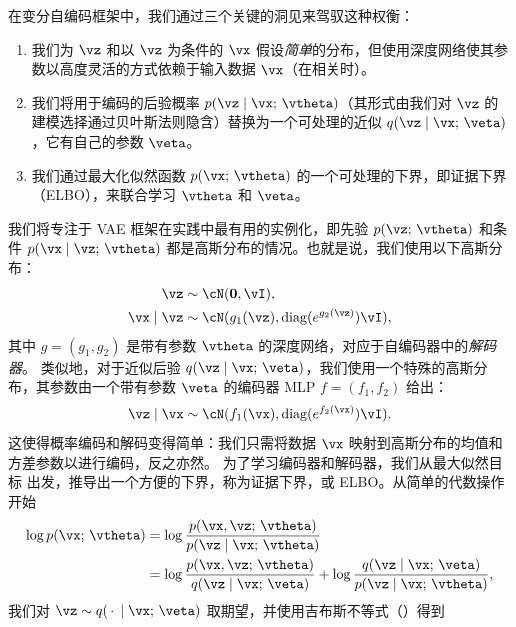 \documentclass[../../book-main.tex]{subfiles}
\begin{document}
在变分自编码框架中，我们通过三个关键的洞见来驾驭这种权衡：
\begin{enumerate}
\item 我们为 $\vz$ 和以 $\vz$ 为条件的 $\vx$ 假设\textit{简单}的分布，但使用深度网络使其参数以高度灵活的方式依赖于输入数据 $\vx$（在相关时）。
\item 我们将用于编码的后验概率 $p(\vz \mid \vx;\, \vtheta)$（其形式由我们对 $\vz$ 的建模选择通过贝叶斯法则隐含）替换为一个可处理的近似 $q(\vz \mid \vx;\, \veta)$，它有自己的参数 $\veta$。
\item 我们通过最大化似然函数 $p(\vx ;\, \vtheta)$ 的一个可处理的下界，即证据下界（ELBO），来联合学习 $\vtheta$ 和 $\veta$。
\end{enumerate}
我们将专注于 VAE 框架在实践中最有用的实例化，即先验 $p(\vz ;\, \vtheta)$ 和条件 $p(\vx \mid \vz;\,
\vtheta)$ 都是高斯分布的情况。也就是说，我们使用以下高斯分布：
\begin{align*}
\vz &\sim \cN(\Zero, \vI), \\
\vx \mid \vz &\sim \cN(g_1(\vz), \diag(e^{g_2(\vz)}) \vI),
\end{align*}
其中 $g = (g_1, g_2)$ 是带有参数 $\vtheta$ 的深度网络，对应于自编码器中的\textit{解码器}。
类似地，对于近似后验 $q(\vz \mid \vx;\, \veta)$，我们使用一个特殊的高斯分布，其参数由一个带有参数 $\veta$ 的编码器 MLP $f = (f_1, f_2)$ 给出：
\begin{equation*}
\vz \mid \vx \sim \cN(f_1(\vx), \diag(e^{f_2(\vx)}) \vI).
\end{equation*}
这使得概率编码和解码变得简单：我们只需将数据 $\vx$ 映射到高斯分布的均值和方差参数以进行编码，反之亦然。
为了学习编码器和解码器，我们从最大似然目标  出发，推导出一个方便的下界，称为证据下界，或 ELBO。从简单的代数操作开始
\begin{align*}
\log p(\vx;\, \vtheta) &=
\log \frac{p(\vx, \vz;\, \vtheta)}{p(\vz \mid \vx;\, \vtheta)}
\\
&=
\log \frac{p(\vx, \vz;\, \vtheta)}{q(\vz \mid \vx;\, \veta)}
+
\log \frac{q(\vz \mid \vx;\, \veta)}{p(\vz \mid \vx;\, \vtheta)},
\end{align*}
我们对 $\vz \sim q(\,\cdot\, \mid
\vx;\, \veta)$ 取期望，并使用吉布斯不等式（）得到
\end{document}
